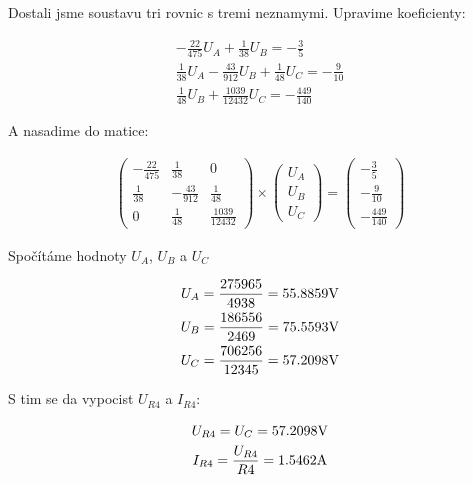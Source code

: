 Dostali jsme soustavu tri rovnic s tremi neznamymi. Upravime koeficienty:

\begin{gather*}
    - \frac{22}{475} U_{A} + \frac{1}{38} U_{B} = - \frac{3}{5} \\
    \frac{1}{38} U_{A} - \frac{43}{912} U_{B} + \frac{1}{48} U_{C} = - \frac{9}{10}  \\
    \frac{1}{48} U_{B} + \frac{1039}{12432} U_{C} = - \frac{449}{140}
\end{gather*}

A nasadime do matice:

\begin{gather*}
    \begin{pmatrix}
        -\frac{22}{475} & \frac{1}{38}    & 0 \\
        \frac{1}{38}    & -\frac{43}{912} & \frac{1}{48} \\
        0               & \frac{1}{48}    & \frac{1039}{12432}
    \end{pmatrix}
    \times
    \begin{pmatrix}
        U_{A} \\
        U_{B} \\
        U_{C}
    \end{pmatrix}
    =
    \begin{pmatrix}
        - \frac{3}{5} \\
        - \frac{9}{10}  \\
        - \frac{449}{140}
    \end{pmatrix}
\end{gather*}

Spočítáme hodnoty $U_{A}$, $U_{B}$ a $U_{C}$

\begin{gather*}
    U_{A} = \frac{275965}{4938} = 55.8859 \Vo \\
    U_{B} = \frac{186556}{2469} = 75.5593 \Vo \\
    U_{C} = \frac{706256}{12345} = 57.2098 \Vo
\end{gather*}

S tim se da vypocist $U_{R4}$ a $I_{R4}$:

\begin{gather*}
    U_{R4} = U_{C} = 57.2098 \Vo \\
    I_{R4} = \frac{U_{R4}}{R4} = 1.5462 \Am
\end{gather*}
